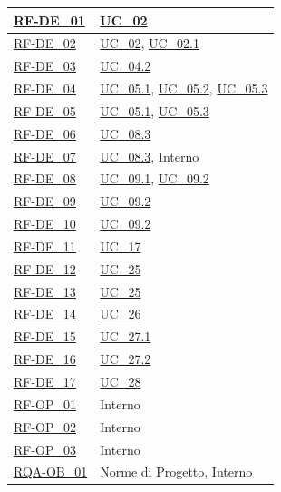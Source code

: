 \begin{longtable}{|>{\raggedright}p{}|>{\raggedright\arraybackslash}p{}|}
    \hyperlink{rf-de_1}{RF-DE\_01} & \hyperref[uc_02]{UC\_02} \\ \hline
    \hyperlink{rf-de_2}{RF-DE\_02} & \hyperref[uc_02]{UC\_02}, \hyperref[uc_02.1]{UC\_02.1} \\ \hline
    \hyperlink{rf-de_3}{RF-DE\_03} & \hyperref[uc_04.2]{UC\_04.2} \\ \hline
    \hyperlink{rf-de_4}{RF-DE\_04} & \hyperref[uc_05.1]{UC\_05.1}, \hyperref[uc_05.2]{UC\_05.2}, \hyperref[uc_05.3]{UC\_05.3} \\ \hline
    \hyperlink{rf-de_5}{RF-DE\_05} & \hyperref[uc_05.1]{UC\_05.1}, \hyperref[uc_05.3]{UC\_05.3} \\ \hline
    \hyperlink{rf-de_6}{RF-DE\_06} & \hyperref[uc_08.3]{UC\_08.3} \\ \hline
    \hyperlink{rf-de_7}{RF-DE\_07} & \hyperref[uc_08.3]{UC\_08.3}, Interno \\ \hline
    \hyperlink{rf-de_8}{RF-DE\_08} & \hyperref[uc_09.1]{UC\_09.1}, \hyperref[uc_09.2]{UC\_09.2} \\ \hline
    \hyperlink{rf-de_9}{RF-DE\_09} & \hyperref[uc_09.2]{UC\_09.2} \\ \hline
    \hyperlink{rf-de_10}{RF-DE\_10} & \hyperref[uc_09.2]{UC\_09.2} \\ \hline
    \hyperlink{rf-de_11}{RF-DE\_11} & \hyperref[uc_17]{UC\_17} \\ \hline
    \hyperlink{rf-de_12}{RF-DE\_12} & \hyperref[uc_25]{UC\_25} \\ \hline
    \hyperlink{rf-de_13}{RF-DE\_13} & \hyperref[uc_25]{UC\_25} \\ \hline
    \hyperlink{rf-de_14}{RF-DE\_14} & \hyperref[uc_26]{UC\_26} \\ \hline
    \hyperlink{rf-de_15}{RF-DE\_15} & \hyperref[uc_27.1]{UC\_27.1} \\ \hline
    \hyperlink{rf-de_16}{RF-DE\_16} & \hyperref[uc_27.2]{UC\_27.2} \\ \hline
    \hyperlink{rf-de_17}{RF-DE\_17} & \hyperref[uc_28]{UC\_28} \\ \hline

    \hyperlink{rf-op_1}{RF-OP\_01} & Interno \\ \hline
    \hyperlink{rf-op_2}{RF-OP\_02} & Interno \\ \hline
    \hyperlink{rf-op_3}{RF-OP\_03} & Interno \\ \hline

    \hyperlink{rqa-ob_1}{RQA-OB\_01} & Norme di Progetto, Interno \\ \hline


\end{longtable}
